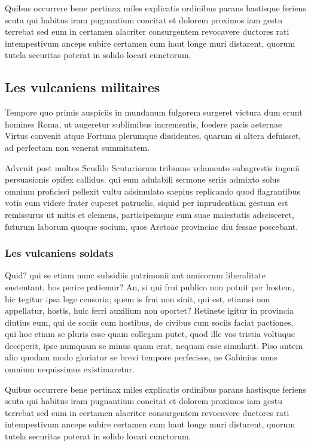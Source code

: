 \documentclass{framatexclass}
\begin{document}
Quibus occurrere bene pertinax miles explicatis ordinibus parans hastisque feriens scuta qui habitus iram pugnantium concitat et dolorem proximos iam gestu terrebat sed eum in certamen alacriter consurgentem revocavere ductores rati intempestivum anceps subire certamen cum haut longe muri distarent, quorum tutela securitas poterat in solido locari cunctorum.

\subsection{Les vulcaniens militaires}
Tempore quo primis auspiciis in mundanum fulgorem surgeret victura dum erunt homines Roma, ut augeretur sublimibus incrementis, foedere pacis aeternae Virtus convenit atque Fortuna plerumque dissidentes, quarum si altera defuisset, ad perfectam non venerat summitatem.

Advenit post multos Scudilo Scutariorum tribunus velamento subagrestis ingenii persuasionis opifex callidus. qui eum adulabili sermone seriis admixto solus omnium proficisci pellexit vultu adsimulato saepius replicando quod flagrantibus votis eum videre frater cuperet patruelis, siquid per inprudentiam gestum est remissurus ut mitis et clemens, participemque eum suae maiestatis adscisceret, futurum laborum quoque socium, quos Arctoae provinciae diu fessae poscebant.


\subsubsection{Les vulcaniens soldats}
Quid? qui se etiam nunc subsidiis patrimonii aut amicorum liberalitate sustentant, hos perire patiemur? An, si qui frui publico non potuit per hostem, hic tegitur ipsa lege censoria; quem is frui non sinit, qui est, etiamsi non appellatur, hostis, huic ferri auxilium non oportet? Retinete igitur in provincia diutius eum, qui de sociis cum hostibus, de civibus cum sociis faciat pactiones, qui hoc etiam se pluris esse quam collegam putet, quod ille vos tristia voltuque deceperit, ipse numquam se minus quam erat, nequam esse simularit. Piso autem alio quodam modo gloriatur se brevi tempore perfecisse, ne Gabinius unus omnium nequissimus existimaretur.

Quibus occurrere bene pertinax miles explicatis ordinibus parans hastisque feriens scuta qui habitus iram pugnantium concitat et dolorem proximos iam gestu terrebat sed eum in certamen alacriter consurgentem revocavere ductores rati intempestivum anceps subire certamen cum haut longe muri distarent, quorum tutela securitas poterat in solido locari cunctorum.
\end{document}
